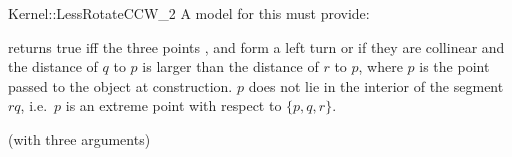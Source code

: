 \begin{ccRefFunctionObjectConcept}{Kernel::LessRotateCCW_2}
A model for this must provide:


{returns true iff the three points ,  
and  form a left turn or if they are collinear and
the distance of $q$ to $p$ is
larger than the distance of $r$ to $p$, where $p$ is the point
passed to the object at construction.
\ccPrecond $p$ does not lie in the interior of the segment $rq$,
i.e.~$p$ is an extreme point with respect to $\{p,q,r\}$.}

\ccRefines
{} (with three arguments)

\end{ccRefFunctionObjectConcept}
